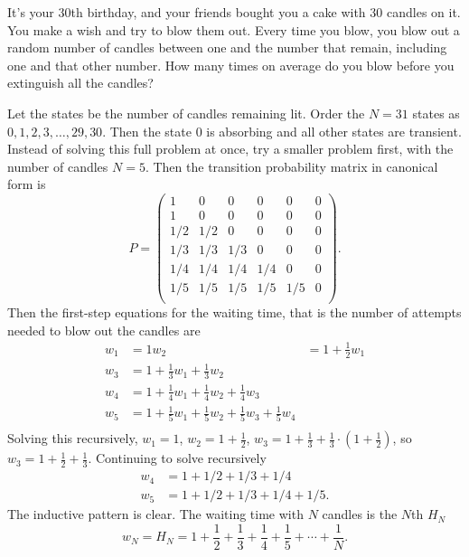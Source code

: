 \documentclass[12pt]{article}
\begin{document}
\begin{example}

    It’s your \( 30 \)th birthday, and your friends bought you a
    cake with \( 30 \) candles on it.  You make a wish and try to blow
    them out. Every time you blow, you blow out a random number of
    candles between one and the number that remain, including one and
    that other number.  How many times on average do you blow before you
    extinguish all the candles?

    Let the states be the number of candles remaining lit.  Order the
    \( N= 31 \) states as \( 0, 1, 2, 3, \dots, 29, 30 \).  Then the
    state \( 0 \) is absorbing and all other states are transient.
    Instead of solving this full problem at once, try a smaller
    problem first, with the number of candles \( N = 5 \). Then the
    transition probability matrix in canonical form is
    \[
        P =
        \begin{pmatrix}
            1 & 0 & 0 & 0 & 0 & 0 \\
            1 & 0 & 0  & 0 & 0 & 0 \\
            1/2 & 1/2 & 0 & 0 & 0 & 0 \\
            1/3 & 1/3 & 1/3 & 0 & 0 & 0 \\
            1/4 & 1/4 & 1/4 & 1/4 & 0 & 0 \\
            1/5 & 1/5 & 1/5 & 1/5 & 1/5 & 0 \\
        \end{pmatrix}.
    \] Then the first-step equations for the waiting time, that is the number of
    attempts needed to blow out the candles are
    \begin{align*}
        w_1 &= 1
        w_2 &= 1 + \frac{1}{2} w_1 \\
        w_3 &= 1 + \frac{1}{3} w_1 + \frac{1}{3} w_2 \\
        w_4 &= 1 + \frac{1}{4} w_1 + \frac{1}{4} w_2 + \frac{1}{4} w_3 \\
      w_5 &= 1 + \frac{1}{5} w_1 + \frac{1}{5} w_2 + \frac{1}{5} w_3 + \frac{1}{5} w_4\\
    \end{align*}
    Solving this recursively, \( w_1 = 1 \), \( w_2 = 1 + \frac{1}{2} \),
    \( w_{3} = 1 + \frac{1}{3} + \frac{1}{3} \cdot (1+ \frac{1}{2})  \), so \(
    w_3 = 1 + \frac{1}{2} + \frac{1}{3} \).  Continuing to solve
    recursively
    \begin{align*}
        w_4 &= 1 + 1/2 + 1/3 + 1/4 \\
        w_5 &= 1 + 1/2 + 1/3 + 1/4 + 1/5.
    \end{align*}
    The inductive pattern is clear.  The waiting time with \( N \)
    candles is the \( N \)th  \( H_N \)%
    \[
        w_N = H_N = 1 + \frac{1}{2} + \frac{1}{3} + \frac{1}{4} 
              + \frac{1}{5} + \cdots + \frac{1}{N}.
    \]


\end{example}
\end{document}
